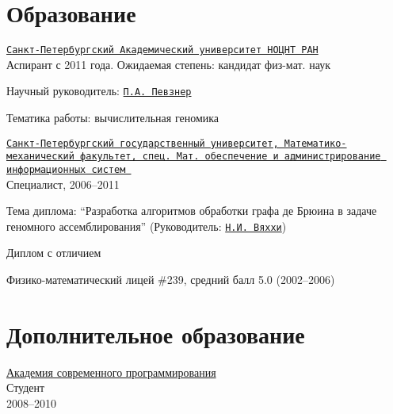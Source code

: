 \section{Образование}
%
\href{http://spbau.ru/}{\tt Санкт-Петербургский Академический университет НОЦНТ РАН}\\
  Аспирант с 2011 года. Ожидаемая степень: кандидат физ-мат. наук
\begin{innerlist}
  \item Научный руководитель: \href{http://cseweb.ucsd.edu/~ppevzner/}{\tt П.А. Певзнер}
  \item Тематика работы: вычислительная геномика
\end{innerlist}

\blankline 

\href{http://www.math.spbu.ru/en/index.html}{\tt Санкт-Петербургский государственный университет, Математико-механический факультет, спец. Мат. обеспечение и администрирование информационных систем 
}\\
  Специалист, 2006--2011 %
\begin{innerlist}
  \item Тема диплома: ``Разработка алгоритмов обработки графа де Брюина 
  в задаче геномного ассемблирования'' (Руководитель: \href{http://spbsu.ru/vyahhi/}{\tt Н.И. Вяххи})
  \item Диплом с отличием
\end{innerlist}

\blankline

Физико-математический лицей \#239, средний балл 5.0 (2002--2006)

\section{Дополнительное образование}
\href{http://www.amse.ru/}{Академия современного программирования}\\
      Студент\\
      2008--2010

\blankline




